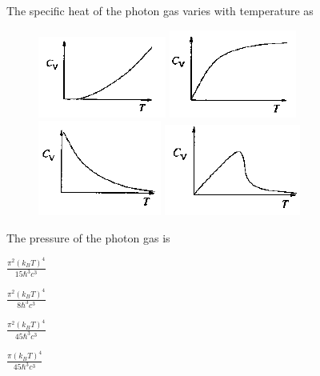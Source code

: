 \documentclass{exam}
\begin{document}
\begin{questions}
\question The specific heat of the photon gas varies with temperature as\hfill{}
\begin{figure}[H]
	\centering
	\caption*{} \label{50a} \includegraphics[width=0.35\columnwidth]{pics/50a.png}
	\caption*{} \label{50b} \includegraphics[width=0.35\columnwidth]{pics/50b.png}
	\caption*{} \label{50c} \includegraphics[width=0.35\columnwidth]{pics/50c.png}
	\caption*{} \label{50d} \includegraphics[width=0.35\columnwidth]{pics/50d.png}
\end{figure}

\question The pressure of the photon gas is\hfill{}

\begin{enumerate} \begin{multicols}{4}
	\item $\frac{\pi^2(k_B T)^4}{15 \hbar^3 c^3}$ \item $\frac{\pi^2(k_B T)^4}{8 \hbar^3 c^3}$
	\item $\frac{\pi^2(k_B T)^4}{45 \hbar^3 c^3}$ \item $\frac{\pi(k_B T)^4}{45 \hbar^3 c^3}$
\end{multicols} \end{enumerate}


\end{questions}
\end{document}
